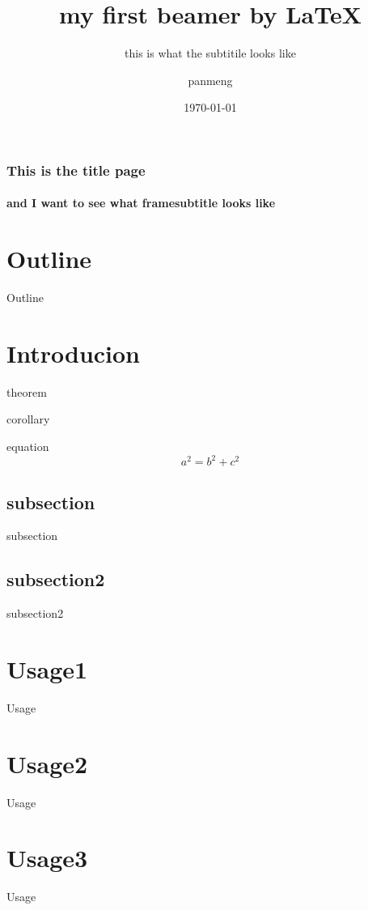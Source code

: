 \documentclass{beamer}
\title{my first beamer by \LaTeX}
\subtitle{this is what the subtitile looks like}
\author{panmeng}
\institute{ise}
\date{\today}
\begin{document}
    \begin{frame}
        \frametitle{This is the title page}
        \framesubtitle{and I want to see what framesubtitle looks like}
    \end{frame}

\section*{Outline}
    \begin{frame}{Outline}
        \tableofcontents
    \end{frame}

\section{Introducion}
    \begin{frame}
        \begin{theorem}
            theorem
        \end{theorem}

        \begin{corollary}
            corollary
        \end{corollary}

        \begin{block}{equation}
            \begin{equation}
                a^2 = b^2 + c^2
            \end{equation}
        \end{block}
    \end{frame}

\subsection{subsection}
    \begin{frame}
        subsection
    \end{frame}
\subsection{subsection2}
    \begin{frame}
        subsection2
    \end{frame}
\section{Usage1}
    \begin{frame}
        Usage
    \end{frame}
\section{Usage2}
    \begin{frame}
        Usage
    \end{frame}
\section{Usage3}
    \begin{frame}
        Usage
    \end{frame}
\end{document}
